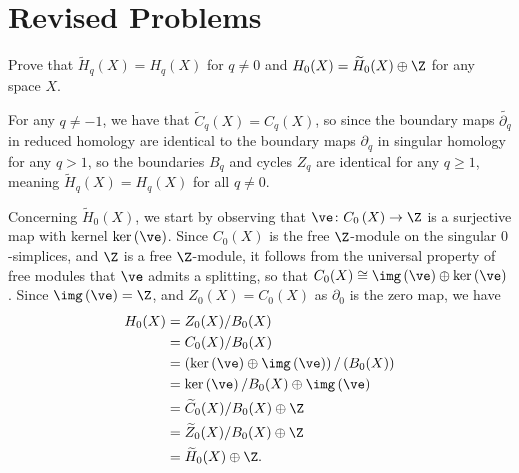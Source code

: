 \documentclass[10pt]{mypackage}
\begin{document}
\RaggedRight
\section{Revised Problems}%
\begin{problem}
  Prove that $\widetilde{H}_q(X) = H_q(X)$ for $q\neq 0$ and $H_0(X) = \widetilde{H}_0(X)\oplus \Z$ for any space $X$. 
\end{problem}
\begin{solution}
  For any $q\neq -1$, we have that $\widetilde{C}_q(X) = C_q(X)$, so since the boundary maps $\widetilde{\partial_q}$ in reduced homology are identical to the boundary maps $\partial_q$ in singular homology for any $q > 1$, so the boundaries $B_q$ and cycles $Z_q$ are identical for any $q\geq 1$, meaning $\widetilde{H}_q(X) = H_q(X)$ for all $q\neq 0$.

  Concerning $\widetilde{H}_0(X)$, we start by observing that $\ve\colon C_0\left( X \right)\rightarrow \Z$ is a surjective map with kernel $\ker\left( \ve \right)$. Since $C_0(X)$ is the free $\Z$-module on the singular $0$-simplices, and $\Z$ is a free $\Z$-module, it follows from the universal property of free modules that $\ve$ admits a splitting, so that $C_0(X)\cong \img\left( \ve \right)\oplus \ker\left( \ve \right)$. Since $\img\left( \ve \right) = \Z$, and $Z_0(X) = C_0(X)$ as $\partial_0$ is the zero map, we have
  \begin{align*}
    H_0(X) &= Z_0(X)/B_0(X)\\
           &= C_0(X)/B_0(X)\\
           &= \left( \ker\left( \ve \right) \oplus \img\left( \ve \right) \right)/\left( B_0(X) \right)\\
           &= \ker\left( \ve \right)/B_0(X)\oplus \img\left( \ve \right)\\
           &= \widetilde{C}_0(X)/B_0(X)\oplus \Z\\
           &= \widetilde{Z}_0(X)/B_0(X)\oplus \Z\\
           &= \widetilde{H}_0(X)\oplus \Z.
  \end{align*}
\end{solution}
\end{document}
